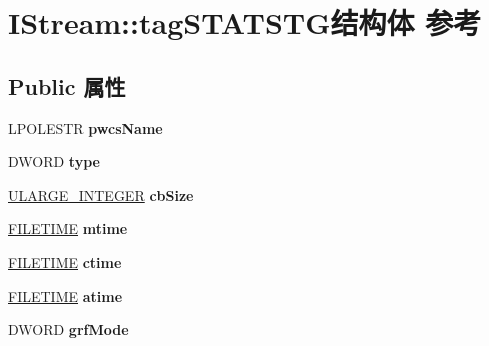 \hypertarget{struct_i_stream_1_1tag_s_t_a_t_s_t_g}{}\section{I\+Stream\+:\+:tag\+S\+T\+A\+T\+S\+T\+G结构体 参考}
\label{struct_i_stream_1_1tag_s_t_a_t_s_t_g}
\subsection*{Public 属性}
\begin{DoxyCompactItemize}
\item 
\mbox{\label{struct_i_stream_1_1tag_s_t_a_t_s_t_g_ab8465c8470ecd65911742c93dd2fb345}} 
L\+P\+O\+L\+E\+S\+TR {\bfseries pwcs\+Name}
\item 
\mbox{\label{struct_i_stream_1_1tag_s_t_a_t_s_t_g_a33d58c501ffdcf7d424523e6226a6309}} 
D\+W\+O\+RD {\bfseries type}
\item 
\mbox{\label{struct_i_stream_1_1tag_s_t_a_t_s_t_g_a2f4cef99ff24923362b41d9eeac38114}} 
\hyperlink{struct___u_l_a_r_g_e___i_n_t_e_g_e_r}{U\+L\+A\+R\+G\+E\+\_\+\+I\+N\+T\+E\+G\+ER} {\bfseries cb\+Size}
\item 
\mbox{\label{struct_i_stream_1_1tag_s_t_a_t_s_t_g_a2af54dfdf4dbaa632b36100ba038a1d6}} 
\hyperlink{struct___f_i_l_e_t_i_m_e}{F\+I\+L\+E\+T\+I\+ME} {\bfseries mtime}
\item 
\mbox{\label{struct_i_stream_1_1tag_s_t_a_t_s_t_g_aa24f9aa733fee4ccbc8fd5404f641888}} 
\hyperlink{struct___f_i_l_e_t_i_m_e}{F\+I\+L\+E\+T\+I\+ME} {\bfseries ctime}
\item 
\mbox{\label{struct_i_stream_1_1tag_s_t_a_t_s_t_g_a74be793dd4566e6300372a4942f495fc}} 
\hyperlink{struct___f_i_l_e_t_i_m_e}{F\+I\+L\+E\+T\+I\+ME} {\bfseries atime}
\item 
\mbox{\label{struct_i_stream_1_1tag_s_t_a_t_s_t_g_a0d88408f74ec5c32c245a35c0cb46a7f}} 
D\+W\+O\+RD {\bfseries grf\+Mode}

\end{DoxyCompactItemize}
